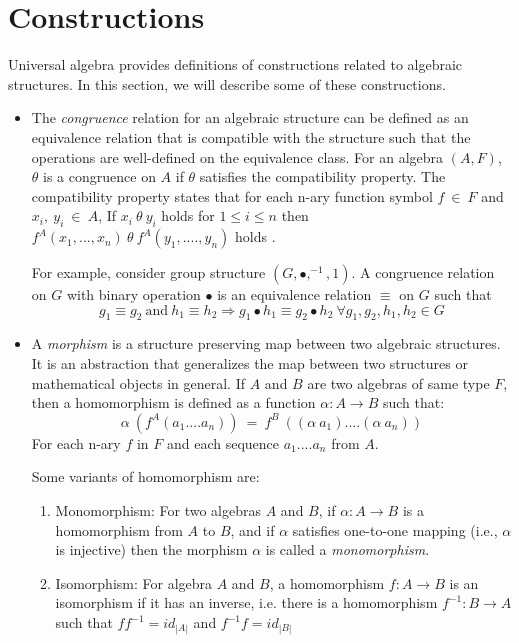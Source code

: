 \section{Constructions}
Universal algebra provides definitions of constructions related to algebraic
structures. In this section, we will describe some of these constructions. 
\begin{itemize}
    \item The \textit{congruence} relation for an algebraic structure can be
    defined as an equivalence relation that is compatible with the structure
    such that the operations are well-defined on the equivalence class. For an
    algebra $(A,F)$, $\theta$ is a congruence on $A$ if $\theta$ satisfies the
    compatibility property. The compatibility property states that for each
    n-ary function symbol $f \ \in\ F$ and $x_i,\ y_i\ \in\ A$, If $x_i\ \theta\
    y_i$ holds for \(1\leq i \leq n\) then $f^{A}(x_1,...,x_n)\ \theta\
    f^{A}(y_1,....,y_n)$ holds \cite{sankappanavar1981course}.

    For example, consider group structure $(G, ∙, ^{-1}, 1)$. A
    congruence relation on $G$ with binary operation $∙$ is an equivalence
    relation $\equiv$ on $G$ such that \[g_1\equiv g_2\ \text{and}\ h_1 \equiv h_2
    \Rightarrow g_1 ∙ h_1 \equiv g_2 ∙ h_2\ \forall g_1,g_2,h_1,h_2 \in G\] 

    \item A \textit{morphism} is a structure preserving map between two
    algebraic structures. It is an abstraction that generalizes the map between
    two structures or mathematical objects in general. If $A$ and $B$ are two
    algebras of same type $F$, then a homomorphism is defined as a function
    $\alpha: A \rightarrow B$ such that: \[ \alpha\ (f^{A}(a_1....a_n))\ =\
    f^{B}\ ((\alpha\ a_1)....(\alpha\ a_n))\] For each n-ary $f$ in $F$ and
    each sequence $a_1....a_n$ from $A$.

    Some variants of homomorphism are:
    \begin{enumerate}
        \item  Monomorphism: For two algebras $A$ and $B$, if \(\alpha : A
        \rightarrow B \) is a homomorphism from $A$ to $B$, and if \(\alpha\)
        satisfies one-to-one mapping (i.e., \(\alpha\) is injective) then the
        morphism \(\alpha\) is called a \textit{monomorphism}.

        \item Isomorphism: For algebra $A$ and $B$, a homomorphism $f:A → B$ is
        an isomorphism if it has an inverse, i.e. there is a homomorphism
        $f^{-1}:B → A$ such that $ff^{-1} =
        id_{|A|}$ and $f^{-1}f = id_{|B|}$ 


\end{enumerate}
\end{itemize}
